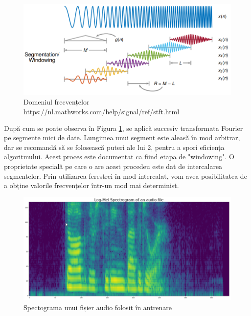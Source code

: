 \documentclass[a4paper, 12pt]{report}
\begin{document}
	\begin{figure}[H]
		\begin{center}
			\includegraphics[width=\linewidth]{images/windowing.PNG}	
		\end{center}
		\caption{Domeniul frecvențelor \newline
			\hspace{\linewidth}https://nl.mathworks.com/help/signal/ref/stft.html}
		\label{fig:windowing}
	\end{figure}

	După cum se poate observa în Figura \ref{fig:windowing}, se aplică succesiv transformata Fourier pe segmente mici de date. Lungimea unui segment este aleasă în mod arbitrar, dar se recomandă să se folosească puteri ale lui 2, pentru a spori eficiența algoritmului. Acest proces este documentat ca fiind etapa de "windowing". O proprietate specială pe care o are acest procedeu este dat de intercalarea segmentelor. Prin utilizarea ferestrei în mod intercalat, vom avea posibilitatea de a obține valorile frecvențelor într-un mod mai determinist.
	
	\begin{figure}[H]
		\begin{center}
			\includegraphics[width=\linewidth]{images/spectogram.PNG}	
		\end{center}
		\caption{Spectograma unui fișier audio folosit în antrenare}
		\label{fig:spectogram}
	\end{figure} 
\end{document}
